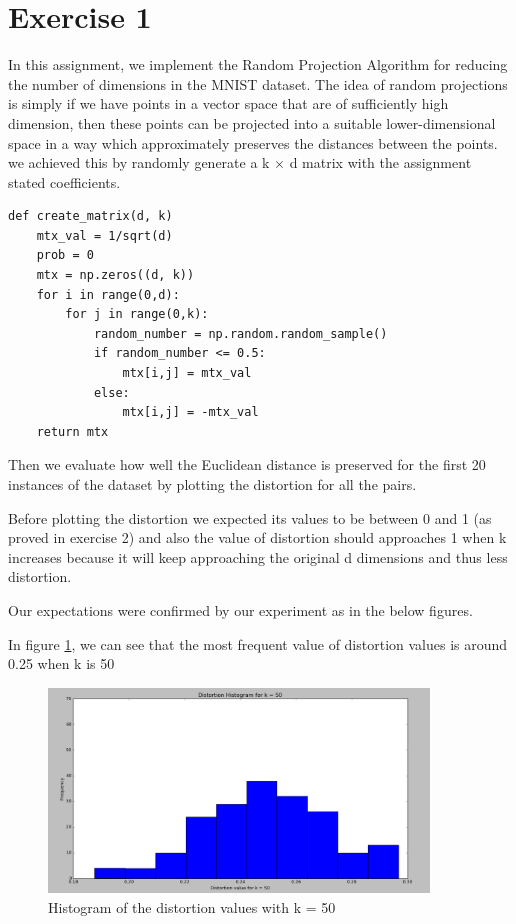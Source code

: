 \section*{Exercise 1}
In this assignment, we implement the Random Projection Algorithm for reducing the number of dimensions in the MNIST dataset. 
The idea of random projections is simply if we have points in a vector space that are of sufficiently high dimension, then these points can be projected into a suitable lower-dimensional space in a way which approximately preserves the distances between the points.
we achieved this by randomly generate a k × d matrix with the assignment stated coefficients.
\begin{lstlisting}[frame=single]
def create_matrix(d, k)    
    mtx_val = 1/sqrt(d)
    prob = 0
    mtx = np.zeros((d, k))
    for i in range(0,d):
        for j in range(0,k):
            random_number = np.random.random_sample()
            if random_number <= 0.5:
                mtx[i,j] = mtx_val
            else:
                mtx[i,j] = -mtx_val        
    return mtx
\end{lstlisting}
    
Then we evaluate how well the Euclidean distance is preserved for the first 20 instances of the dataset by plotting the distortion for all the pairs.

Before plotting the distortion we expected its values to be between 0 and 1 (as proved in exercise 2) and also the value of distortion should approaches 1 when k increases because it will keep approaching the original d dimensions and thus less distortion.
   
Our expectations were confirmed by our experiment as in the below figures. 

In figure \ref{k50}, we can see that the most frequent value of distortion values is around 0.25 when k is 50
\begin{figure}[!htb]
\centering
\includegraphics[width=0.9\textwidth]{shots/k50.png}
\caption{Histogram of the distortion values with k = 50  }
\label{k50}
\end{figure}

